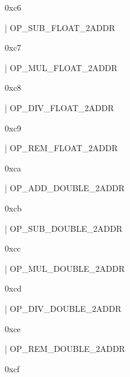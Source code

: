 \documentclass[11pt]{article}
\begin{document}
\begin{ocamldoccomment}
0xc6
\end{ocamldoccomment}
\begin{ocamldoccode}
  | OP_SUB_FLOAT_2ADDR
\end{ocamldoccode}
\begin{ocamldoccomment}
0xc7
\end{ocamldoccomment}
\begin{ocamldoccode}
  | OP_MUL_FLOAT_2ADDR
\end{ocamldoccode}
\begin{ocamldoccomment}
0xc8
\end{ocamldoccomment}
\begin{ocamldoccode}
  | OP_DIV_FLOAT_2ADDR
\end{ocamldoccode}
\begin{ocamldoccomment}
0xc9
\end{ocamldoccomment}
\begin{ocamldoccode}
  | OP_REM_FLOAT_2ADDR
\end{ocamldoccode}
\begin{ocamldoccomment}
0xca
\end{ocamldoccomment}
\begin{ocamldoccode}
  | OP_ADD_DOUBLE_2ADDR
\end{ocamldoccode}
\begin{ocamldoccomment}
0xcb
\end{ocamldoccomment}
\begin{ocamldoccode}
  | OP_SUB_DOUBLE_2ADDR
\end{ocamldoccode}
\begin{ocamldoccomment}
0xcc
\end{ocamldoccomment}
\begin{ocamldoccode}
  | OP_MUL_DOUBLE_2ADDR
\end{ocamldoccode}
\begin{ocamldoccomment}
0xcd
\end{ocamldoccomment}
\begin{ocamldoccode}
  | OP_DIV_DOUBLE_2ADDR
\end{ocamldoccode}
\begin{ocamldoccomment}
0xce
\end{ocamldoccomment}
\begin{ocamldoccode}
  | OP_REM_DOUBLE_2ADDR
\end{ocamldoccode}
\begin{ocamldoccomment}
0xcf
\end{ocamldoccomment}
\end{document}
